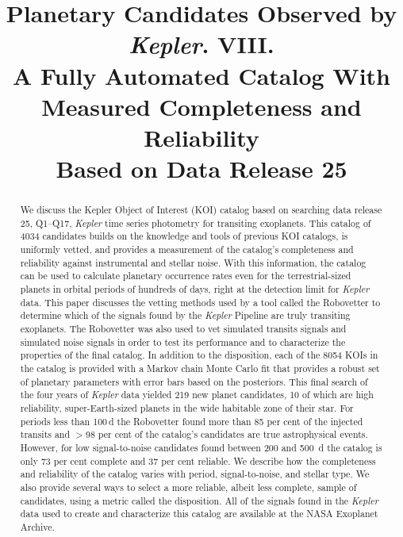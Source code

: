 \documentclass[apj,twocolappendix,numberedappendix]{emulateapj}
\renewcommand{\_}{\discretionary{\underscore}{}{\underscore}}  %
\newcommand\Kepler{\textit{Kepler}}
\begin{document}

\title{Planetary Candidates Observed by \Kepler. VIII.\\
A Fully Automated Catalog With Measured Completeness and Reliability\\Based on Data Release 25 }



\begin{abstract}
We discuss the Kepler Object of Interest (KOI) catalog based on searching data release 25, Q1--Q17, \Kepler{} time series photometry for transiting exoplanets.  This catalog of 4034 candidates builds on the knowledge and tools of previous KOI catalogs, is uniformly vetted, and provides a measurement of the catalog's completeness and reliability against instrumental and stellar noise. With this information, the catalog can be used to calculate planetary occurrence rates even for the terrestrial-sized planets in orbital periods of hundreds of days, right at the detection limit for \Kepler{} data.  This paper discusses the vetting methods used by a tool called the Robovetter to determine which of the \ntces{} signals found by the \Kepler{} Pipeline are truly transiting exoplanets.  The Robovetter was also used to vet simulated transits signals and simulated noise signals in order to test its performance and to characterize the properties of the final catalog. In addition to the disposition, each of the 8054 KOIs in the catalog is provided with a Markov chain Monte Carlo fit that provides a robust set of planetary parameters with error bars based on the posteriors. This final search of the four years of \Kepler{} data yielded 219 new planet candidates, 10 of which are high reliability, super-Earth-sized planets in the wide habitable zone of their star. For periods less than 100\,d the Robovetter found more than 85 per cent of the injected transits and $>$98 per cent of the catalog's candidates are true astrophysical events.   However, for low signal-to-noise candidates found between 200 and 500 \,d the catalog is only 73 per cent complete and 37 per cent reliable. We describe how the completeness and reliability of the catalog varies with period, signal-to-noise, and stellar type. We also provide several ways to select a more reliable, albeit less complete, sample of candidates, using a metric called the disposition. All of the signals found in the \Kepler{} data used to create and characterize this catalog are available at the NASA Exoplanet Archive.



\end{abstract}
\end{document}
